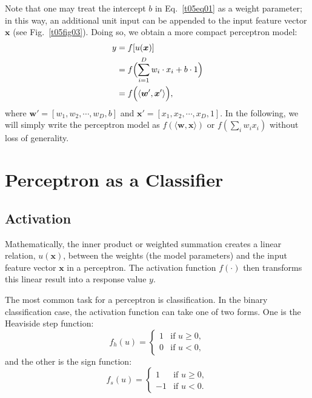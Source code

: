 \documentclass[12pt]{article}
\begin{document}
Note that one may treat the intercept $b$ in Eq.~\ref{t05eq01} as a weight parameter; in this way, an additional unit input can be appended to the input feature vector $\bm{x}$ (see Fig.~\ref{t05fig03}). Doing so, we obtain a more compact perceptron model:
\begin{equation}
\begin{split}
    y & = f[u(\bm{x})] \\
      & = f\Bigl(\sum_{i = 1}^{D} w_i \cdot x_i + b \cdot 1\Bigr)\\
      & = f\Bigl(\langle \bm{w}', \bm{x}'\rangle\Bigr),
\end{split}
\label{t05eq02}
\end{equation}
where \(\bm{w}' = [w_1, w_2, \cdots, w_D, b]\) and \(\bm{x}' = [x_1, x_2, \cdots, x_D, 1]\). In the following, we will simply write the perceptron model as \(f(\langle \bm{w}, \bm{x}\rangle)\) or \(f\left(\sum_i w_i x_i\right)\) without loss of generality.

\section{Perceptron as a Classifier}
\subsection{Activation}
Mathematically, the inner product or weighted summation creates a linear relation, \(u(\bm{x})\), between the weights (the model parameters) and the input feature vector \(\bm{x}\) in a perceptron. The activation function \(f(\cdot)\) then transforms this linear result into a response value \(y\).

The most common task for a perceptron is classification. In the binary classification case, the activation function can take one of two forms. One is the Heaviside step function:
\begin{equation}
    f_h(u)= \begin{cases} 
      1 & \text{if } u \geq 0, \\
      0 & \text{if } u < 0,
      \end{cases}
      \label{t05eq03}
\end{equation}
and the other is the sign function:
\begin{equation}
    f_s(u)= \begin{cases} 
      1 & \text{if } u \geq 0, \\
      -1 & \text{if } u < 0.
      \end{cases}
      \label{t05eq04}
\end{equation}
\end{document}
